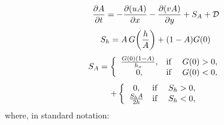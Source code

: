 \vspace{.2cm}
\begin{equation}
  {\partial A \over \partial t} =
  - {\partial (uA) \over \partial x} - {\partial (vA) \over \partial y}
  + S_A + {\cal D}
\label{st3b}
\end{equation}
\vspace{.2cm}
\begin{equation}
   S_h = A \, G \! \left( {h \over A} \right) + (1-A)G(0)
\end{equation}
{\samepage
\[
   S_A = \left\{ \begin{array}{cl}
       {G(0)(1-A) \over h_o},  &  \mbox{if \quad} G(0) > 0, \\
       0,               &  \mbox{if \quad} G(0) < 0,
       \end{array} \right.
\]
\begin{equation}
   + \left\{ \begin{array}{cl}
       0,               &  \mbox{if \quad} S_h > 0, \\
       {S_h A \over 2h}  &  \mbox{if \quad} S_h < 0,
       \end{array} \right.
\end{equation}
}
where, in standard notation:
